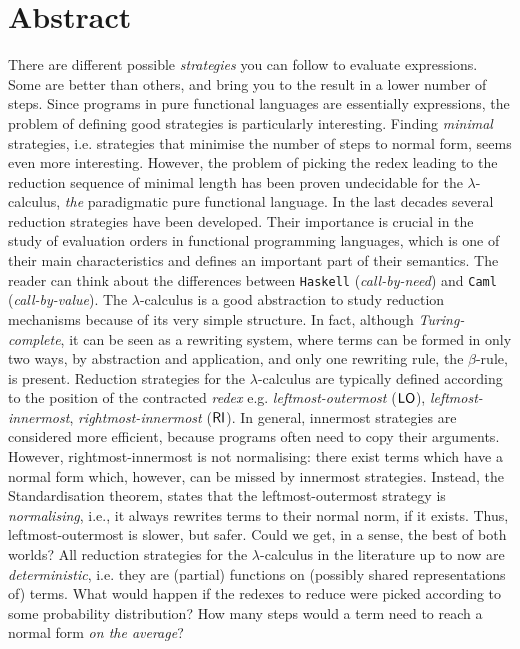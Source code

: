 \begingroup
\let\clearpage\relax
\let\cleardoublepage\relax
\let\cleardoublepage\relax

\chapter*{Abstract}
There are different possible \emph{strategies} you can follow to
evaluate expressions. Some are better than others, and bring you to
the result in a lower number of steps. Since programs in pure
functional languages are essentially expressions, the problem of
defining good strategies is particularly interesting. Finding
\emph{minimal} strategies, i.e. strategies that minimise the number of
steps to normal form, seems even more interesting. However, the problem
of picking the redex leading to the reduction sequence of minimal length
has been proven undecidable for the $\lambda$-calculus, \emph{the} paradigmatic
pure functional language. In the last decades several reduction
strategies have been developed. Their importance is crucial in the
study of evaluation orders in functional programming languages, which
is one of their main characteristics and defines an important part of
their semantics. The reader can think about the differences between
\texttt{Haskell} (\emph{call-by-need}) and \texttt{Caml}
(\emph{call-by-value}). The $\lambda$-calculus is a good abstraction
to study reduction mechanisms because of its very simple
structure. In fact, although \emph{Turing-complete}, it can be seen as
a rewriting system, where terms can be formed
in only two ways, by abstraction and application, and only one
rewriting rule, the $\beta$-rule, is present. Reduction strategies for
the $\lambda$-calculus are typically defined according to the position
of the contracted \emph{redex} e.g. \emph{leftmost-outermost} ($\textsf{LO}$),
\emph{leftmost-innermost}, \emph{rightmost-innermost} ($\textsf{RI}$).
In general, innermost strategies are considered more efficient, because
programs often need to copy their arguments. However, rightmost-innermost is not normalising: there
exist terms which have a normal form which, however, can be missed by
innermost strategies. Instead, the Standardisation theorem, states that the leftmost-outermost strategy is
\emph{normalising}, i.e., it always rewrites terms to their normal
norm, if it exists. Thus, leftmost-outermost is slower, but
safer. Could we get, in a sense, the best of both worlds?  All
reduction strategies for the $\lambda$-calculus in the literature up
to now are \emph{deterministic}, i.e. they are (partial) functions on
(possibly shared representations of) terms. What would
happen if the redexes to reduce were picked according to some
probability distribution? How many steps would a term need to reach a
normal form \emph{on the average}?


